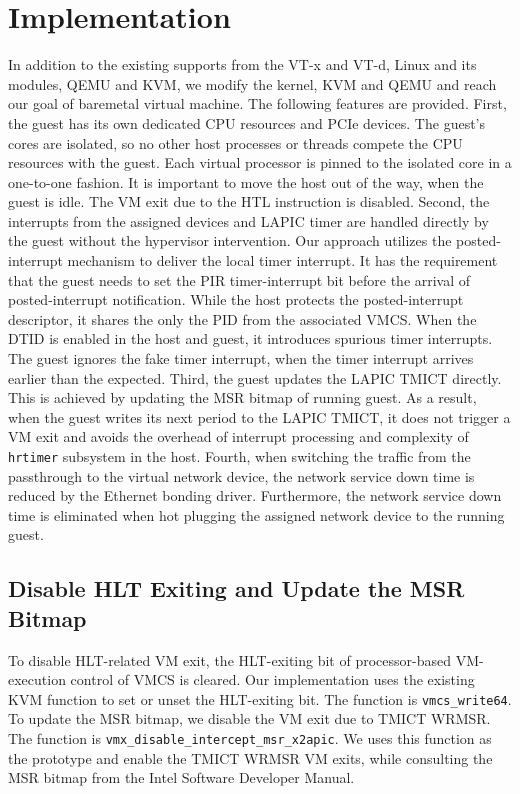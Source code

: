 \section{Implementation}


In addition to the existing supports from the VT-x and VT-d,
Linux and its modules, QEMU and KVM, we modify the kernel, KVM
and QEMU and reach our goal of baremetal virtual machine. The
following features are provided. First, the guest has its own
dedicated CPU resources and PCIe devices. The guest's cores
are isolated, so no other host processes or threads compete
the CPU resources with the guest. Each virtual processor is
pinned to the isolated core in a one-to-one fashion. It is
important to move the host out of the way, when the guest is
idle. The VM exit due to the HTL instruction is disabled.
Second, the interrupts from the assigned devices and LAPIC
timer are handled directly by the guest without the hypervisor
intervention. Our approach utilizes the posted-interrupt
mechanism to deliver the local timer interrupt. It has the
requirement that the guest needs to set the PIR
timer-interrupt bit before the arrival of posted-interrupt
notification. While the host protects the posted-interrupt
descriptor, it shares the only the PID from the associated
VMCS. When the DTID is enabled in the host and guest, it
introduces spurious timer interrupts. The guest ignores the
fake timer interrupt, when the timer interrupt arrives earlier
than the expected. Third, the guest updates the LAPIC TMICT
directly. This is achieved by updating the MSR bitmap of
running guest. As a result, when the guest writes its next
period to the LAPIC TMICT, it does not trigger a VM exit and
avoids the overhead of interrupt processing and complexity of
\texttt{hrtimer} subsystem in the host. Fourth, when switching
the traffic from the passthrough to the virtual network
device, the network service down time is reduced by the
Ethernet bonding driver. Furthermore, the network service down
time is eliminated when hot plugging the assigned network
device to the running guest.

\subsection{Disable HLT Exiting and Update the MSR Bitmap}
To disable HLT-related VM exit, the HLT-exiting bit of
processor-based VM-execution control of VMCS is cleared. Our
implementation uses the existing KVM function to set or unset
the HLT-exiting bit. The function is \texttt{vmcs\_write64}.
To update the MSR bitmap, we disable the VM exit due to TMICT
WRMSR. The function is
\texttt{vmx\_disable\_intercept\_msr\_x2apic}. We uses this
function as the prototype and enable the TMICT WRMSR VM exits,
while consulting the MSR bitmap from the Intel Software
Developer Manual.

